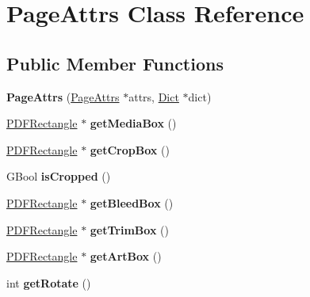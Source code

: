 \hypertarget{class_page_attrs}{}\section{Page\+Attrs Class Reference}
\label{class_page_attrs}
\subsection*{Public Member Functions}
\begin{DoxyCompactItemize}
\item 
\mbox{\label{class_page_attrs_afcaeca6ada9319965bd99d92ddfc3933}} 
{\bfseries Page\+Attrs} (\hyperlink{class_page_attrs}{Page\+Attrs} $\ast$attrs, \hyperlink{class_dict}{Dict} $\ast$dict)
\item 
\mbox{\label{class_page_attrs_a3c2efd6d72223d8791e5e58a2e4af3bb}} 
\hyperlink{class_p_d_f_rectangle}{P\+D\+F\+Rectangle} $\ast$ {\bfseries get\+Media\+Box} ()
\item 
\mbox{\label{class_page_attrs_a18a4ed08ca588e8531b4bc1b03ba29c3}} 
\hyperlink{class_p_d_f_rectangle}{P\+D\+F\+Rectangle} $\ast$ {\bfseries get\+Crop\+Box} ()
\item 
\mbox{\label{class_page_attrs_af1ff0c034ea64f3771c4b45e1ce05ca7}} 
G\+Bool {\bfseries is\+Cropped} ()
\item 
\mbox{\label{class_page_attrs_a29be18825330b9523f0c7f0afb5bb925}} 
\hyperlink{class_p_d_f_rectangle}{P\+D\+F\+Rectangle} $\ast$ {\bfseries get\+Bleed\+Box} ()
\item 
\mbox{\label{class_page_attrs_a35700e8abbed6592ff3cb1a97b504d1e}} 
\hyperlink{class_p_d_f_rectangle}{P\+D\+F\+Rectangle} $\ast$ {\bfseries get\+Trim\+Box} ()
\item 
\mbox{\label{class_page_attrs_a346cc79912fc000313ecc35df31ed186}} 
\hyperlink{class_p_d_f_rectangle}{P\+D\+F\+Rectangle} $\ast$ {\bfseries get\+Art\+Box} ()
\item 
\mbox{\label{class_page_attrs_a6a8eeb0355a74327a40b9b64d346cf6b}} 
int {\bfseries get\+Rotate} ()

\end{DoxyCompactItemize}
